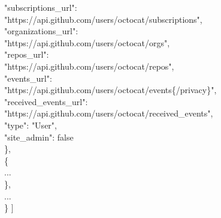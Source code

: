 \documentclass[11pt]{article}
\begin{document}
\begin{itemize}
\begin{itemize}
{{		\textcolor{r}{"subscriptions\_url"}: \\\textcolor{b}{"https://api.github.com/users/octocat/subscriptions"},\\
		\textcolor{r}{"organizations\_url"}: \\\textcolor{b}{"https://api.github.com/users/octocat/orgs"},\\
		\textcolor{r}{"repos\_url"}: \\\textcolor{b}{"https://api.github.com/users/octocat/repos"},\\
		\textcolor{r}{"events\_url"}: \\\textcolor{b}{"https://api.github.com/users/octocat/events\{/privacy\}"},\\
		\textcolor{r}{"received\_events\_url"}: \\\textcolor{b}{"https://api.github.com/users/octocat/received\_events"},\\
		\textcolor{r}{"type"}: \textcolor{b}{"User"},\\
		\textcolor{r}{"site\_admin"}: \textcolor{b}{false}\\
		\},\\
  		\{\\
		...\\
  		\},\\
  		...\\
		\}
		]
   	 }
	}
   \end{itemize}


\end{itemize}
\end{document}
